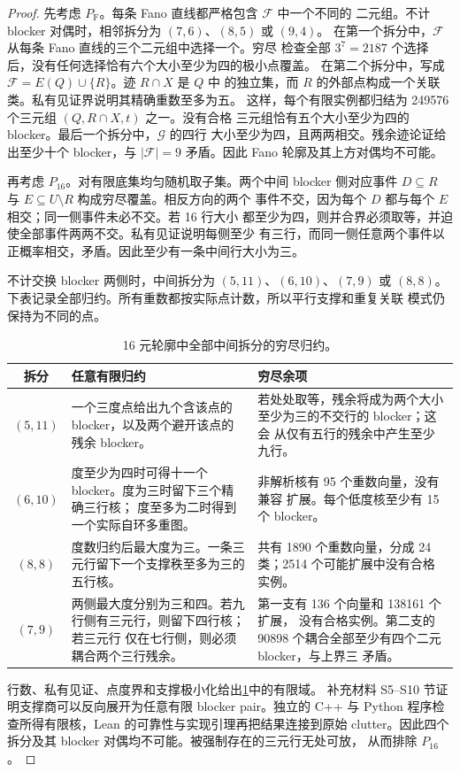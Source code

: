 \documentclass[UTF8,11pt,a4paper,fontset=fandol]{ctexart}
\theoremstyle{definition}
\theoremstyle{remark}
\begin{document}
\begin{proof}
先考虑 $P_{\mathrm F}$。每条 Fano 直线都严格包含 $\mathcal F$ 中一个不同的
二元组。不计 blocker 对偶时，相邻拆分为 $(7,6)$、$(8,5)$ 或 $(9,4)$。
在第一个拆分中，$\mathcal F$ 从每条 Fano 直线的三个二元组中选择一个。穷尽
检查全部 $3^7=2187$ 个选择后，没有任何选择恰有六个大小至少为四的极小点覆盖。
在第二个拆分中，写成 $\mathcal F=E(Q)\cup\{R\}$。迹 $R\cap X$ 是 $Q$ 中
的独立集，而 $R$ 的外部点构成一个关联类。私有见证界说明其精确重数至多为五。
这样，每个有限实例都归结为 249576 个三元组 $(Q,R\cap X,t)$ 之一。没有合格
三元组恰有五个大小至少为四的 blocker。最后一个拆分中，$\mathcal G$ 的四行
大小至少为四，且两两相交。残余迹论证给出至少十个 blocker，与
$|\mathcal F|=9$ 矛盾。因此 Fano 轮廓及其上方对偶均不可能。

再考虑 $P_{16}$。对有限底集均匀随机取子集。两个中间 blocker 侧对应事件
$D\subseteq R$ 与 $E\subseteq U\setminus R$ 构成穷尽覆盖。相反方向的两个
事件不交，因为每个 $D$ 都与每个 $E$ 相交；同一侧事件未必不交。若 16 行大小
都至少为四，则并合界必须取等，并迫使全部事件两两不交。私有见证说明每侧至少
有三行，而同一侧任意两个事件以正概率相交，矛盾。因此至少有一条中间行大小为三。

不计交换 blocker 两侧时，中间拆分为 $(5,11)$、$(6,10)$、$(7,9)$ 或
$(8,8)$。下表记录全部归约。所有重数都按实际点计数，所以平行支撑和重复关联
模式仍保持为不同的点。
\begin{table}[htbp]
\centering
\small
\setlength{\tabcolsep}{5pt}
\renewcommand{\arraystretch}{1.16}
\begin{tabular}{c p{} p{}}
\toprule
拆分 & 任意有限归约 & 穷尽余项 \\
\midrule
$(5,11)$ & 一个三度点给出九个含该点的 blocker，以及两个避开该点的残余
blocker。 & 若处处取等，残余将成为两个大小至少为三的不交行的 blocker；这会
从仅有五行的残余中产生至少九行。 \\
$(6,10)$ & 度至少为四时可得十一个 blocker。度为三时留下三个精确三行核；
度至多为二时得到一个实际自环多重图。 & 非解析核有 95 个重数向量，没有兼容
扩展。每个低度核至少有 15 个 blocker。 \\
$(8,8)$ & 度数归约后最大度为三。一条三元行留下一个支撑秩至多为三的五行核。
& 共有 1890 个重数向量，分成 24 类；2514 个可能扩展中没有合格实例。 \\
$(7,9)$ & 两侧最大度分别为三和四。若九行侧有三元行，则留下四行核；若三元行
仅在七行侧，则必须耦合两个三行残余。 & 第一支有 136 个向量和 138161 个扩展，
没有合格实例。第二支的 90898 个耦合全部至少有四个二元 blocker，与上界三
矛盾。 \\
\bottomrule
\end{tabular}
\caption{16 元轮廓中全部中间拆分的穷尽归约。}
\label{tab:exact-splits}
\end{table}


行数、私有见证、点度界和支撑极小化给出\cref{tab:exact-splits}中的有限域。
补充材料 S5--S10 节证明支撑商可以反向展开为任意有限 blocker pair。独立的
C++ 与 Python 程序检查所得有限核，Lean 的可靠性与实现引理再把结果连接到原始
clutter。因此四个拆分及其 blocker 对偶均不可能。被强制存在的三元行无处可放，
从而排除 $P_{16}$。
\end{proof}
\end{document}
